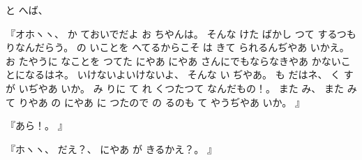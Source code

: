 %
と
へば、

%
『オホヽヽ、
%
か
ておいでだよ
お
ちやんは。
%
そんな
けた
ばかし
つて
するつもりなんだらう。
%
の
いことを
へてるからこそ
は
きて
られるんぢやあ
いかえ。
%
お
たやうに
なことを
つてた
にやあ
にやあ
さんにでもならなきやあ
かないことになるはネ。
%
いけないよいけないよ、
%
そんな
い
ぢやあ。
%
も
だはネ、
%
く
すが
いぢやあ
いか。
%
み
りに
て
れ
くつたつて
なんだもの！。
%
また
み、
%
また
み
て
りやあ
の
にやあ
に
つたので
の
るのも
て
やうぢやあ
いか。
』

%
『あら！。
』

%
『ホヽヽ、
%
だえ？、
%
にやあ
が
きるかえ？。
』
